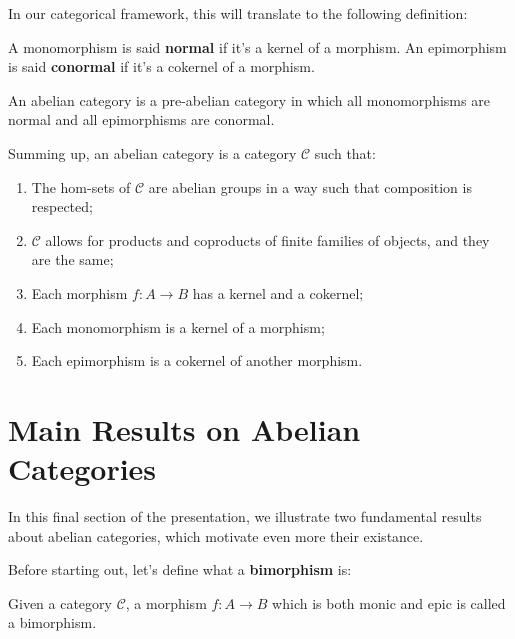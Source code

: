\documentclass{beamer}
\begin{document}
\begin{frame}
    In our categorical framework, this will translate to the following
    definition: \medskip

    \begin{definition}
        A monomorphism is said \textbf{normal} if it's a kernel of a morphism.
        An epimorphism is said \textbf{conormal} if it's a cokernel of a morphism.
    \end{definition}
\end{frame}

\begin{frame}
    \begin{definition}
        An abelian category is a pre-abelian category in which all monomorphisms are normal
        and all epimorphisms are conormal.
    \end{definition}

    Summing up, an abelian category is a category $\mathcal{C}$ such that:
    \begin{enumerate}
        \item The hom-sets of $\mathcal{C}$ are abelian groups in a way such that
            composition is respected;
        \item $\mathcal{C}$ allows for products and coproducts of finite families of objects, and
            they are the same;
        \item Each morphism $f : A \to B$ has a kernel and a cokernel;
        \item Each monomorphism is a kernel of a morphism;
        \item Each epimorphism is a cokernel of another morphism.
    \end{enumerate}
\end{frame}


\section{Main Results on Abelian Categories}

\begin{frame}
    In this final section of the presentation, we illustrate
    two fundamental results about abelian categories, which
    motivate even more their existance. \medskip
    
    Before starting out, let's
    define what a \textbf{bimorphism} is:

    \begin{definition}[Bimorphism]
        Given a category $\mathcal{C}$, a morphism
        $f : A \to B$ which is both monic and epic is
        called a bimorphism. 
    \end{definition}
\end{frame}
\end{document}
